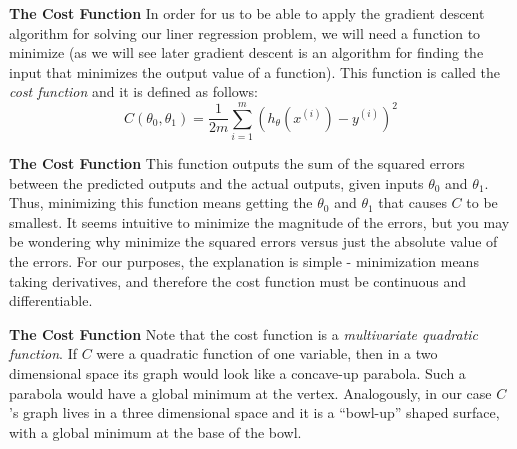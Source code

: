 \documentclass[xcolor=dvipsnames]{beamer}
\begin{document}
\begin{frame}
{\bf The Cost Function}
In order for us to be able to apply the gradient descent algorithm for solving our liner regression problem, we will need a function to minimize (as we will see later gradient descent is an algorithm for finding the input that minimizes the output value of a function). \vfill\pause This function is called the \emph{cost function} and it is defined as follows:\pause
\[
C(\theta_0, \theta_1) = \frac{1}{2m}\sum\limits_{i=1}^m(h_{\theta} (x^{(i)}) - y^{(i)})^2
\]
\end{frame}

\begin{frame}
{\bf The Cost Function}
This function outputs the sum of the squared errors between the predicted outputs and the actual outputs, given inputs $\theta_0$ and $\theta_1$. \vfill\pause
Thus, minimizing this function means getting the $\theta_0$ and $\theta_1$ that causes $C$ to be smallest. \vfill\pause
It seems intuitive to minimize the magnitude of the errors, but you may be wondering why minimize the squared errors versus just the absolute value of the errors. \vfill\pause
For our purposes, the explanation is simple - minimization means taking derivatives, and therefore the cost function must be continuous and differentiable.
\end{frame}

\begin{frame}
{\bf The Cost Function}
Note that the cost function is a \emph{multivariate quadratic function}.\vfill\pause
If $C$ were a quadratic function of one variable, then in a two dimensional space its graph would look like a concave-up parabola. Such a parabola would have a global minimum at the vertex. \vfill\pause
Analogously, in our case $C$'s graph lives in a three dimensional space and it is a ``bowl-up'' shaped surface, with a global minimum at the base of the bowl.\\
\end{frame}
\end{document}
